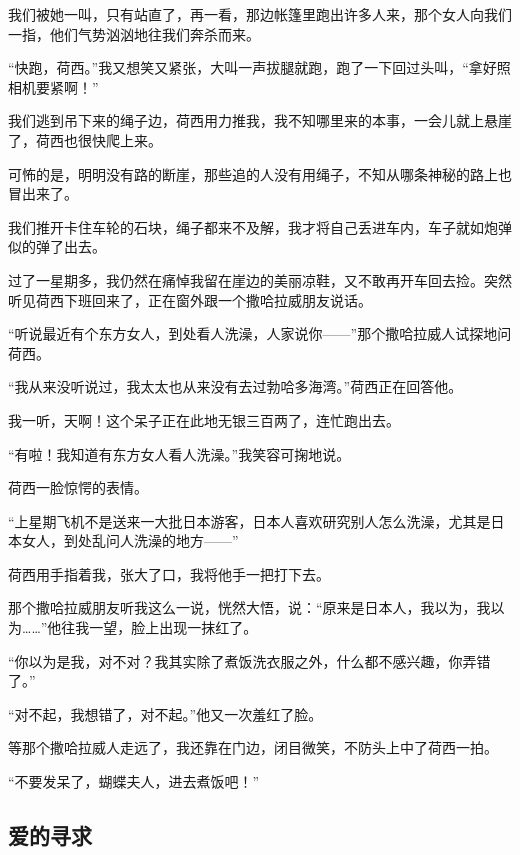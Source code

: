 \par 我们被她一叫，只有站直了，再一看，那边帐篷里跑出许多人来，那个女人向我们一指，他们气势汹汹地往我们奔杀而来。
\par “快跑，荷西。”我又想笑又紧张，大叫一声拔腿就跑，跑了一下回过头叫，“拿好照相机要紧啊！”
\par 我们逃到吊下来的绳子边，荷西用力推我，我不知哪里来的本事，一会儿就上悬崖了，荷西也很快爬上来。
\par 可怖的是，明明没有路的断崖，那些追的人没有用绳子，不知从哪条神秘的路上也冒出来了。
\par 我们推开卡住车轮的石块，绳子都来不及解，我才将自己丢进车内，车子就如炮弹似的弹了出去。
\par 过了一星期多，我仍然在痛悼我留在崖边的美丽凉鞋，又不敢再开车回去捡。突然听见荷西下班回来了，正在窗外跟一个撒哈拉威朋友说话。
\par “听说最近有个东方女人，到处看人洗澡，人家说你——”那个撒哈拉威人试探地问荷西。
\par “我从来没听说过，我太太也从来没有去过勃哈多海湾。”荷西正在回答他。
\par 我一听，天啊！这个呆子正在此地无银三百两了，连忙跑出去。
\par “有啦！我知道有东方女人看人洗澡。”我笑容可掬地说。
\par 荷西一脸惊愕的表情。
\par “上星期飞机不是送来一大批日本游客，日本人喜欢研究别人怎么洗澡，尤其是日本女人，到处乱问人洗澡的地方——”
\par 荷西用手指着我，张大了口，我将他手一把打下去。
\par 那个撒哈拉威朋友听我这么一说，恍然大悟，说：“原来是日本人，我以为，我以为……”他往我一望，脸上出现一抹红了。
\par “你以为是我，对不对？我其实除了煮饭洗衣服之外，什么都不感兴趣，你弄错了。”
\par “对不起，我想错了，对不起。”他又一次羞红了脸。
\par 等那个撒哈拉威人走远了，我还靠在门边，闭目微笑，不防头上中了荷西一拍。
\par “不要发呆了，蝴蝶夫人，进去煮饭吧！”



\subsection{爱的寻求}



